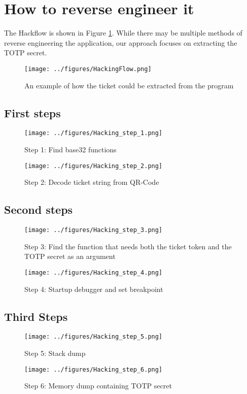 \section{How to reverse engineer it}
The Hackflow is shown in Figure \ref{fig:HackingFlow}. While there may be multiple methods of reverse engineering the application, our approach focuses on extracting the TOTP secret.

\begin{figure}[H]
    \centering
    \texttt{[image: ../figures/HackingFlow.png]}
    \caption{An example of how the ticket could be extracted from the program}
    \label{fig:HackingFlow}
\end{figure}
\subsection{First steps}

\begin{figure}[H]
    \centering
    \texttt{[image: ../figures/Hacking\_step\_1.png]}
    \caption{Step 1: Find base32 functions}
    \label{fig:HackingStep1}
\end{figure}
\begin{figure}[H]
    \centering
    \texttt{[image: ../figures/Hacking\_step\_2.png]}
    \caption{Step 2: Decode ticket string from QR-Code}
    \label{fig:HackingStep2}
\end{figure}
\subsection{Second steps}

\begin{figure}[H]
    \centering
    \texttt{[image: ../figures/Hacking\_step\_3.png]}
    \caption{Step 3: Find the function that needs both the ticket token and the TOTP secret as an argument}
    \label{fig:HackingStep3}
\end{figure}
\begin{figure}[H]
    \centering
    \texttt{[image: ../figures/Hacking\_step\_4.png]}
    \caption{Step 4: Startup debugger and set breakpoint}
    \label{fig:HackingStep4}
\end{figure}


\subsection{Third Steps}

\begin{figure}[H]
    \centering
    \texttt{[image: ../figures/Hacking\_step\_5.png]}
    \caption{Step 5: Stack dump}
    \label{fig:HackingStep5}
\end{figure}
\begin{figure}[H]
    \centering
    \texttt{[image: ../figures/Hacking\_step\_6.png]}
    \caption{Step 6: Memory dump containing TOTP secret}
    \label{fig:HackingStep6}
\end{figure}
